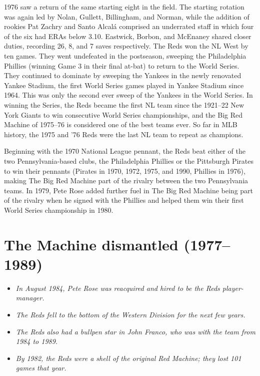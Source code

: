 1976 saw a return of the same starting eight in the field. The starting
rotation was again led by Nolan, Gullett, Billingham, and Norman, while
the addition of rookies Pat Zachry and Santo Alcalá comprised an
underrated staff in which four of the six had ERAs below 3.10. Eastwick,
Borbon, and McEnaney shared closer duties, recording 26, 8, and 7 saves
respectively. The Reds won the NL West by ten games. They went
undefeated in the postseason, sweeping the Philadelphia Phillies
(winning Game 3 in their final at-bat) to return to the World Series.
They continued to dominate by sweeping the Yankees in the newly
renovated Yankee Stadium, the first World Series games played in Yankee
Stadium since 1964. This was only the second ever sweep of the Yankees
in the World Series. In winning the Series, the Reds became the first NL
team since the 1921--22 New York Giants to win consecutive World Series
championships, and the Big Red Machine of 1975--76 is considered one of
the best teams ever. So far in MLB history, the 1975 and '76 Reds were
the last NL team to repeat as champions.

Beginning with the 1970 National League pennant, the Reds beat either of
the two Pennsylvania-based clubs, the Philadelphia Phillies or the
Pittsburgh Pirates to win their pennants (Pirates in 1970, 1972, 1975,
and 1990, Phillies in 1976), making The Big Red Machine part of the
rivalry between the two Pennsylvania teams. In 1979, Pete Rose added
further fuel in The Big Red Machine being part of the rivalry when he
signed with the Phillies and helped them win their first World Series
championship in 1980.

\section{The Machine dismantled
(1977--1989)}\label{the-machine-dismantled-19771989}

\begin{itemize}
\item
  \emph{In August 1984, Pete Rose was reacquired and hired to be the
  Reds player-manager.}
\item
  \emph{The Reds fell to the bottom of the Western Division for the next
  few years.}
\item
  \emph{The Reds also had a bullpen star in John Franco, who was with
  the team from 1984 to 1989.}
\item
  \emph{By 1982, the Reds were a shell of the original Red Machine; they
  lost 101 games that year.}
\end{itemize}

